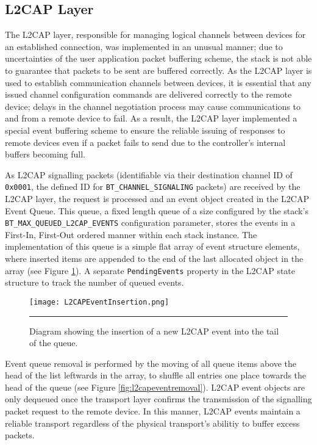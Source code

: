 \FloatBarrier
\subsection{L2CAP Layer}

The L2CAP layer, responsible for managing logical channels between devices for an established connection, was implemented in an unusual manner; due to uncertainties of the user application packet buffering scheme, the stack is not able to guarantee that packets to be sent are buffered correctly. As the L2CAP layer is used to establish communication channels between devices, it is essential that any issued channel configuration commands are delivered correctly to the remote device; delays in the channel negotiation process may cause communications to and from a remote device to fail. As a result, the L2CAP layer implemented a special event buffering scheme to ensure the reliable issuing of responses to remote devices even if a packet fails to send due to the controller's internal buffers becoming full.

As L2CAP signalling packets (identifiable via their destination channel ID of \texttt{0x0001}, the defined ID for \lstinline{BT_CHANNEL_SIGNALING} packets) are received by the L2CAP layer, the request is processed and an event object created in the L2CAP Event Queue. This queue, a fixed length queue of a size configured by the stack's \lstinline{BT_MAX_QUEUED_L2CAP_EVENTS} configuration parameter, stores the events in a First-In, First-Out ordered manner within each stack instance. The implementation of this queue is a simple flat array of event structure elements, where inserted items are appended to the end of the last allocated object in the array (see Figure \ref{fig:l2capeventinsertion}). A separate \lstinline{PendingEvents} property in the L2CAP state structure to track the number of queued events.

\begin{figure}[tbph]
	\vspace{1em}
	\centering
		\texttt{[image: L2CAPEventInsertion.png]}
	\rule{35em}{0.5pt}
	\caption[L2CAP Event Object Queue Insertion]{Diagram showing the insertion of a new L2CAP event into the tail of the queue.}
	\label{fig:l2capeventinsertion}
\end{figure}

Event queue removal is performed by the moving of all queue items above the head of the list leftwards in the array, to shuffle all entries one place towards the head of the queue (see Figure \ref{fig:l2capeventremoval}). L2CAP event objects are only dequeued once the transport layer confirms the transmission of the signalling packet request to the remote device. In this manner, L2CAP events maintain a reliable transport regardless of the physical transport's abilitiy to buffer excess packets.

